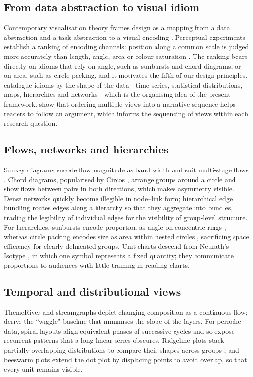 \documentclass{article}
\begin{document}
\subsection{From data abstraction to visual idiom}
Contemporary visualisation theory frames design as a mapping from a data abstraction and a task abstraction
to a visual encoding \citep{munzner2014}. Perceptual experiments establish a ranking of encoding channels:
position along a common scale is judged more accurately than length, angle, area or colour saturation
\citep{cleveland1984}. The ranking bears directly on idioms that rely on angle, such as sunbursts and chord
diagrams, or on area, such as circle packing, and it motivates the fifth of our design principles.
\citet{heer2010zoo} catalogue idioms by the shape of the data---time series, statistical distributions,
maps, hierarchies and networks---which is the organising idea of the present framework. \citet{segel2010}
show that ordering multiple views into a narrative sequence helps readers to follow an argument, which informs
the sequencing of views within each research question.

\subsection{Flows, networks and hierarchies}
Sankey diagrams encode flow magnitude as band width and suit multi-stage flows \citep{riehmann2005}. Chord
diagrams, popularised by Circos \citep{krzywinski2009}, arrange groups around a circle and show flows
between pairs in both directions, which makes asymmetry visible. Dense networks quickly become illegible in
node--link form; hierarchical edge bundling \citep{holten2006} routes edges along a hierarchy so that they
aggregate into bundles, trading the legibility of individual edges for the visibility of group-level
structure. For hierarchies, sunbursts encode proportion as angle on concentric rings \citep{stasko2000},
whereas circle packing encodes size as area within nested circles \citep{wang2006}, sacrificing space
efficiency for clearly delineated groups. Unit charts descend from Neurath's Isotype \citep{neurath1936}, in
which one symbol represents a fixed quantity; they communicate proportions to audiences with little
training in reading charts.

\subsection{Temporal and distributional views}
ThemeRiver \citep{havre2000} and streamgraphs \citep{byron2008} depict changing composition as a continuous
flow; \citet{byron2008} derive the ``wiggle'' baseline that minimises the slope of the layers. For periodic
data, spiral layouts \citep{weber2001} align equivalent phases of successive cycles and so expose recurrent
patterns that a long linear series obscures. Ridgeline plots stack partially overlapping distributions to
compare their shapes across groups \citep{wilke2019}, and beeswarm plots extend the dot plot
\citep{wilkinson1999} by displacing points to avoid overlap, so that every unit remains visible.
\end{document}
